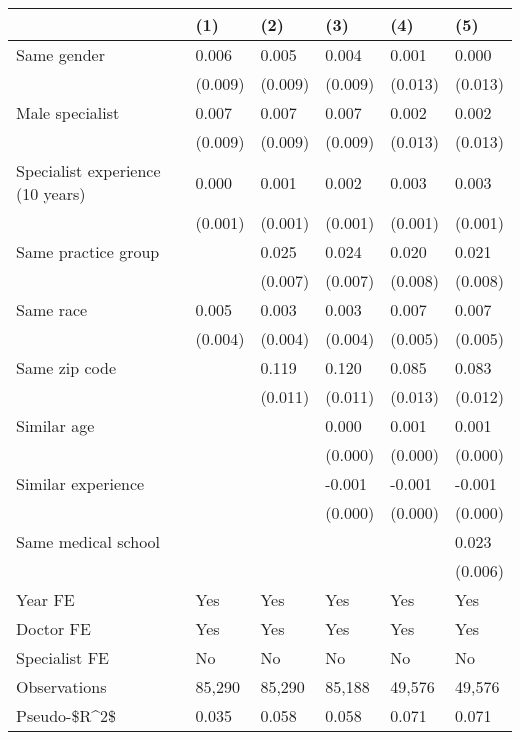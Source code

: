 \begin{tabular}{llllll}
\hline
& (1) & (2) & (3) & (4) & (5) \\ \hline
Same gender                        & 0.006   & 0.005   & 0.004   & 0.001   & 0.000   \\
& (0.009) & (0.009) & (0.009) & (0.013) & (0.013) \\
Male specialist                    & 0.007   & 0.007   & 0.007   & 0.002   & 0.002   \\
& (0.009) & (0.009) & (0.009) & (0.013) & (0.013) \\
Specialist experience (10 years)   & 0.000   & 0.001   & 0.002   & 0.003   & 0.003   \\
& (0.001) & (0.001) & (0.001) & (0.001) & (0.001) \\
Same practice group                &         & 0.025   & 0.024   & 0.020   & 0.021   \\
&         & (0.007) & (0.007) & (0.008) & (0.008) \\
Same race                          & 0.005   & 0.003   & 0.003   & 0.007   & 0.007   \\
& (0.004) & (0.004) & (0.004) & (0.005) & (0.005) \\
Same zip code                      &         & 0.119   & 0.120   & 0.085   & 0.083   \\
&         & (0.011) & (0.011) & (0.013) & (0.012) \\
Similar age                        &         &         & 0.000   & 0.001   & 0.001   \\
&         &         & (0.000) & (0.000) & (0.000) \\
Similar experience                 &         &         & -0.001  & -0.001  & -0.001  \\
&         &         & (0.000) & (0.000) & (0.000) \\
Same medical school                &         &         &         &         & 0.023   \\
&         &         &         &         & (0.006) \\
Year FE                            & Yes     & Yes     & Yes     & Yes     & Yes     \\
Doctor FE                          & Yes     & Yes     & Yes     & Yes     & Yes     \\
Specialist FE                      & No      & No      & No      & No      & No      \\
Observations                       & 85,290  & 85,290  & 85,188  & 49,576  & 49,576  \\
Pseudo-\$R\textasciicircum{}2\$ & 0.035   & 0.058   & 0.058   & 0.071   & 0.071   \\
\hline
\end{tabular}
